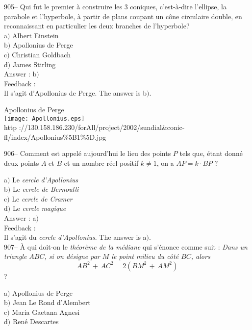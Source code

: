 ﻿\documentclass[letterpaper, 12pt]{article}
\begin{document}
905-- Qui fut le premier \`a construire les 3 coniques,
c'est-\`a-dire l'ellipse, la parabole et l'hyperbole, \`a partir
de plans coupant un c\^one circulaire double, en reconnaissant en
particulier les deux branches de l'hyperbole?\\

a$)$ Albert Einstein \\
b$)$ Apollonius de Perge \\
c$)$ Christian Goldbach \\
d$)$ James Stirling  \\

Answer : b$)$\\

Feedback : \\
Il s'agit d'Apollonius de Perge. The answer is b$)$.\\

        \begin{center}
        Apollonius de Perge\\
    \texttt{[image: Apollonius.eps]}\\
        {\footnotesize http
://130.158.186.230/forAll/project/2002/sundial\&conic-fl/index/Apollonius\%5B1\%5D.jpg}
    \end{center}

906-- Comment est appel\'e aujourd'hui le lieu des points $P$ tels que,
\'etant donn\'e deux points $A$ et $B$
et un nombre r\'eel positif $k\not=1$, on a $AP=k\cdot BP$ ?

a$)$ Le {\sl cercle d'Apollonius} \\
b$)$ Le {\sl cercle de Bernoulli} \\
c$)$ Le {\sl cercle de Cramer} \\
d$)$ Le {\sl cercle magique}  \\

Answer : a$)$\\

Feedback : \\
Il s'agit du {\sl cercle d'Apollonius}. The answer is a$)$.\\

907-- \`A qui doit-on le {\sl th\'eor\`eme de la m\'ediane} qui
s'\'enonce comme suit : {\sl \og Dans un triangle $ABC$, si on
d\'esigne par $M$ le point milieu du c\^ot\'e $BC$, alors
$$AB^2\,+\,AC^2=2(BM^2\,+\,AM^2)$$}\fg ?

a$)$ Apollonius de Perge \\
b$)$ Jean Le Rond d'Alembert \\
c$)$ Maria Gaetana Agnesi \\
d$)$ Ren\'e Descartes \\
\end{document}
